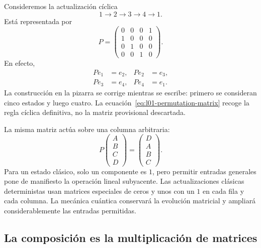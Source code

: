 Consideremos la actualización cíclica
\begin{equation}
  1\longrightarrow2\longrightarrow3\longrightarrow4\longrightarrow1.
  \label{eq:l01-four-cycle}
\end{equation}
Está representada por
\begin{equation}
  P=
  \begin{pmatrix}
    0&0&0&1\\
    1&0&0&0\\
    0&1&0&0\\
    0&0&1&0
  \end{pmatrix}.
  \label{eq:l01-permutation-matrix}
\end{equation}
En efecto,
\begin{equation}
  \begin{aligned}
    Pe_1&=e_2, & Pe_2&=e_3,\\
    Pe_3&=e_4, & Pe_4&=e_1.
  \end{aligned}
\end{equation}
La construcción en la pizarra se corrige mientras se escribe: primero se consideran cinco estados y luego cuatro. La ecuación~\eqref{eq:l01-permutation-matrix} recoge la regla cíclica definitiva, no la matriz provisional descartada.

La misma matriz actúa sobre una columna arbitraria:
\begin{equation}
  P
  \begin{pmatrix}A\\B\\C\\D\end{pmatrix}
  =
  \begin{pmatrix}D\\A\\B\\C\end{pmatrix}.
  \label{eq:l01-cyclic-shift}
\end{equation}
Para un estado clásico, solo un componente es \(1\), pero permitir entradas generales pone de manifiesto la operación lineal subyacente. Las actualizaciones clásicas deterministas usan matrices especiales de ceros y unos con un \(1\) en cada fila y cada columna. La mecánica cuántica conservará la evolución matricial y ampliará considerablemente las entradas permitidas.

\subsection{La composición es la multiplicación de matrices}

